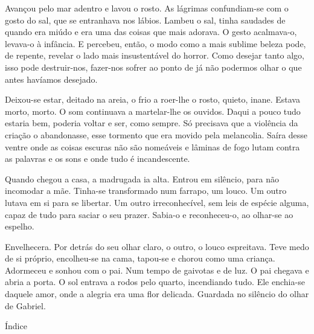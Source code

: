 Avançou pelo mar adentro e lavou o rosto. As lágrimas confundiam-se com
o gosto do sal, que se entranhava nos lábios. Lambeu o sal, tinha
saudades de quando era miúdo e era uma das coisas que mais adorava. O
gesto acalmava-o, levava-o à infância. E percebeu, então, o modo como a
mais sublime beleza pode, de repente, revelar o lado mais insustentável
do horror. Como desejar tanto algo, isso pode destruir-nos, fazer-nos
sofrer ao ponto de já não podermos olhar o que antes havíamos desejado.

Deixou-se estar, deitado na areia, o frio a roer-lhe o rosto, quieto,
inane. Estava morto, morto. O som continuava a martelar-lhe os ouvidos.
Daqui a pouco tudo estaria bem, poderia voltar e ser, como sempre. Só
precisava que a violência da criação o abandonasse, esse tormento que
era movido pela melancolia. Saíra desse ventre onde as coisas escuras
não são nomeáveis e lâminas de fogo lutam contra as palavras e os sons e
onde tudo é incandescente.

Quando chegou a casa, a madrugada ia alta. Entrou em silêncio, para não
incomodar a mãe. Tinha-se transformado num farrapo, um louco. Um outro
lutava em si para se libertar. Um outro irreconhecível, sem leis de
espécie alguma, capaz de tudo para saciar o seu prazer. Sabia-o e
reconheceu-o, ao olhar-se ao espelho.

Envelhecera. Por detrás do seu olhar claro, o outro, o louco espreitava.
Teve medo de si próprio, encolheu-se na cama, tapou-se e chorou como uma
criança. Adormeceu e sonhou com o pai. Num tempo de gaivotas e de luz. O
pai chegava e abria a porta. O sol entrava a rodos pelo quarto,
incendiando tudo. Ele enchia-se daquele amor, onde a alegria era uma
flor delicada. Guardada no silêncio do olhar de Gabriel.

Índice

